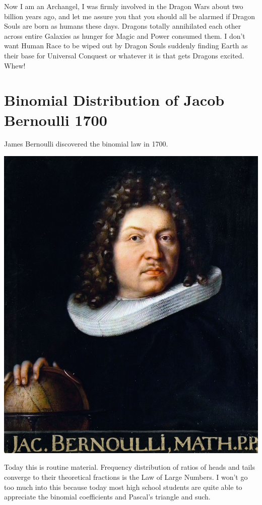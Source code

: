 \documentclass{amsart}
\begin{document}
Now I am an Archangel, I was firmly involved in the Dragon Wars about two billion years ago, and let me assure you that you should all be alarmed if Dragon Souls are born as humans these days.  Dragons totally annihilated each other across entire Galaxies as hunger for Magic and Power consumed them.  I don't want Human Race to be wiped out by Dragon Souls suddenly finding Earth as their base for Universal Conquest or whatever it is that gets Dragons excited.  Whew!

\section{Binomial Distribution of Jacob Bernoulli 1700}

James Bernoulli discovered the binomial law in 1700.

\includegraphics[scale=0.1]{bernoulli.jpg}

Today this is routine material.  Frequency distribution of ratios of heads and tails converge to their theoretical fractions is the Law of Large Numbers.  I won't go too much into this because today most high school students are quite able to appreciate the binomial coefficients and Pascal's triangle and such.
\end{document}
